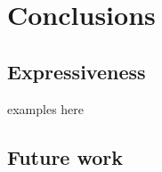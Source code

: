 \chapter{Conclusions}
\label{chp:conclusions}

\section{\rooplpp Expressiveness}
\label{sec:expressiveness}
examples here

\section{Future work}
\label{sec:future-work}


